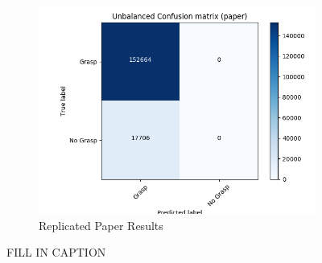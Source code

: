\begin{figure}[t!]
\begin{subfigure}[t]{0.24\textwidth}
        \end{subfigure}
    \begin{subfigure}[t]{0.24\textwidth}
        \includegraphics[width=0.9\columnwidth]{figs/paper_original.png} \caption{Replicated Paper Results} \label{fig:from_paper}
    \end{subfigure}
\caption{FILL IN CAPTION} \label{fig:confusion_matrices}
\end{figure}